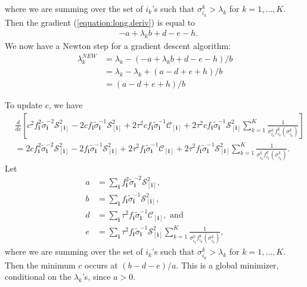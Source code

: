 where we are summing over the set of $i_{k}$'s such that $\sigma_{i_k}^k > \lambda_k$ for $k = 1,\ldots,K$. Then the gradient (\ref{equation:long.deriv}) is equal to
\begin{align*}
&-a + \lambda_k b + d - e - h.
\end{align*}
We now have a Newton step for a gradient descent algorithm:
\begin{align*}
\lambda_k^{NEW} &= \lambda_k - (-a + \lambda_k b + d - e - h) / b\\
&= \lambda_k  - \lambda_k  + (a - d + e + h) / b\\
&= (a - d + e + h) / b
\end{align*}

To update $c$, we have
\begin{align*}
&\frac{d}{dc}\left[c^2f_{\mathbf{i}}^2\tilde{\sigma}^{-2}_{\mathbf{i}}\mathcal{S}_{[\mathbf{i}]}^2 - 2 cf_{\mathbf{i}}\tilde{\sigma}^{-1}_{\mathbf{i}}\mathcal{S}_{[\mathbf{i}]}^2 + 2\tau^2cf_{\mathbf{i}}\tilde{\sigma}^{-1}_{\mathbf{i}}\mathcal{C}_{[\mathbf{i}]} + 2\tau^2cf_{\mathbf{i}}\tilde{\sigma}^{-1}_{\mathbf{i}}\mathcal{S}_{[\mathbf{i}]}^2 \sum_{k=1}^K\frac{1}{\sigma_{i_k}^kf_{i_k}^k(\sigma_{i_k}^k)}\right]\\
&=2cf_{\mathbf{i}}^2\tilde{\sigma}^{-2}_{\mathbf{i}}\mathcal{S}_{[\mathbf{i}]}^2 - 2f_{\mathbf{i}}\tilde{\sigma}^{-1}_{\mathbf{i}}\mathcal{S}_{[\mathbf{i}]}^2 + 2\tau^2f_{\mathbf{i}}\tilde{\sigma}^{-1}_{\mathbf{i}}\mathcal{C}_{[\mathbf{i}]} + 2\tau^2f_{\mathbf{i}}\tilde{\sigma}^{-1}_{\mathbf{i}}\mathcal{S}_{[\mathbf{i}]}^2 \sum_{k=1}^K\frac{1}{\sigma_{i_k}^kf_{i_k}^k(\sigma_{i_k}^k)}.
\end{align*}
Let
\begin{align*}
a &= \sum_{\mathbf{i}}f_{\mathbf{i}}^2\tilde{\sigma}^{-2}_{\mathbf{i}}\mathcal{S}_{[\mathbf{i}]}^2,\\
b &= \sum_{\mathbf{i}}f_{\mathbf{i}}\tilde{\sigma}^{-1}_{\mathbf{i}}\mathcal{S}_{[\mathbf{i}]}^2,\\
d &= \sum_{\mathbf{i}}\tau^2f_{\mathbf{i}}\tilde{\sigma}^{-1}_{\mathbf{i}}\mathcal{C}_{[\mathbf{i}]}, \text{ and}\\
e &= \sum_{\mathbf{i}}\tau^2f_{\mathbf{i}}\tilde{\sigma}^{-1}_{\mathbf{i}}\mathcal{S}_{[\mathbf{i}]}^2 \sum_{k=1}^K\frac{1}{\sigma_{i_k}^kf_{i_k}^k(\sigma_{i_k}^k)},
\end{align*}
where we are summing over the set of $i_k$'s such that $\sigma_{i_k}^k
> \lambda_k$ for $k = 1,\ldots,K$. Then the minimum $c$ occurs at $(b
- d - e)/a$. This is a global minimizer, conditional on the $\lambda_k$'s, since $a > 0$.


